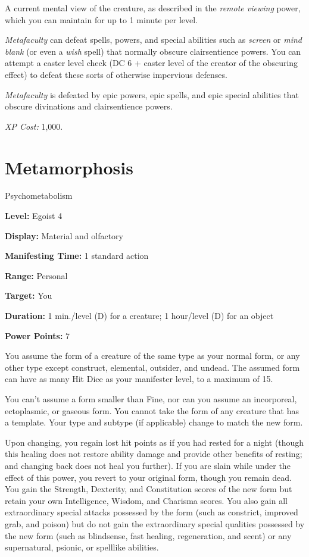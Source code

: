 \documentclass{article}
\begin{document}
\parindent=7pt
A current mental view of the creature, as described in the \textit{remote viewing 
}power, which you can maintain for up to 1 minute per level.

\parindent=0pt
\textit{Metafaculty }can defeat spells, powers, and special abilities such as \textit{screen 
}or \textit{mind blank }(or even a \textit{wish }spell) that normally obscure clairsentience 
powers. You can attempt a caster level check (DC 6 + caster level of the creator 
of the obscuring effect) to defeat these sorts of otherwise impervious defenses.

\textit{Metafaculty }is defeated by epic powers, epic spells, and epic special 
abilities that obscure divinations and clairsentience powers.

\textit{XP Cost: }1,000.

\vspace{12pt}
\section*{Metamorphosis}

Psychometabolism

\textbf{Level:} Egoist 4

\textbf{Display:} Material and olfactory

\textbf{Manifesting Time:} 1 standard action

\textbf{Range:} Personal

\textbf{Target:} You

\textbf{Duration:} 1 min./level (D) for a creature; 1 hour/level (D) for an object

\textbf{Power Points:} 7

You assume the form of a creature of the same type as your normal form, or any 
other type except construct, elemental, outsider, and undead. The assumed form 
can have as many Hit Dice as your manifester level, to a maximum of 15.

You can't assume a form smaller than Fine, nor can you assume an incorporeal, ectoplasmic, 
or gaseous form. You cannot take the form of any creature that has a template. 
Your type and subtype (if applicable) change to match the new form.

Upon changing, you regain lost hit points as if you had rested for a night (though 
this healing does not restore ability damage and provide other benefits of resting; 
and changing back does not heal you further). If you are slain while under the 
effect of this power, you revert to your original form, though you remain dead. 
You gain the Strength, Dexterity, and Constitution scores of the new form but retain 
your own Intelligence, Wisdom, and Charisma scores. You also gain all extraordinary 
special attacks possessed by the form (such as constrict, improved grab, and poison) 
but do not gain the extraordinary special qualities possessed by the new form (such 
as blindsense, fast healing, regeneration, and scent) or any supernatural, psionic, 
or spelllike abilities.
\end{document}
